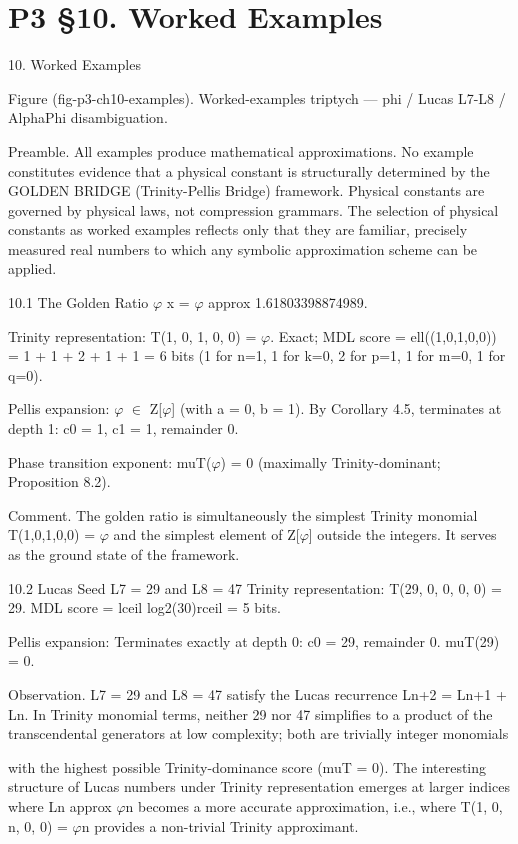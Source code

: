 
\section{P3 §10. Worked Examples}

10. Worked Examples

           Figure (fig-p3-ch10-examples). Worked-examples triptych --- phi / Lucas L7-L8 / AlphaPhi
                                              disambiguation.

  Preamble. All examples produce mathematical approximations. No example constitutes
  evidence that a physical constant is structurally determined by the GOLDEN BRIDGE (Trinity-Pellis Bridge)
  framework. Physical constants are governed by physical laws, not compression
  grammars. The selection of physical constants as worked examples reflects only that
  they are familiar, precisely measured real numbers to which any symbolic
  approximation scheme can be applied.

  10.1 The Golden Ratio $\varphi$
  x = $\varphi$ approx 1.61803398874989.

  Trinity representation: T(1, 0, 1, 0, 0) = $\varphi$. Exact; MDL score = ell((1,0,1,0,0)) = 1 + 1 +
  2 + 1 + 1 = 6 bits (1 for n=1, 1 for k=0, 2 for p=1, 1 for m=0, 1 for q=0).

  Pellis expansion: $\varphi$ $\in$ Z[$\varphi$] (with a = 0, b = 1). By Corollary 4.5, terminates at depth 1:
  c0 = 1, c1 = 1, remainder 0.

  Phase transition exponent: muT($\varphi$) = 0 (maximally Trinity-dominant; Proposition 8.2).

  Comment. The golden ratio is simultaneously the simplest Trinity monomial T(1,0,1,0,0)
  = $\varphi$ and the simplest element of Z[$\varphi$] outside the integers. It serves as the ground state
  of the framework.

  10.2 Lucas Seed L7 = 29 and L8 = 47
  Trinity representation: T(29, 0, 0, 0, 0) = 29. MDL score = lceil log2(30)rceil = 5 bits.

  Pellis expansion: Terminates exactly at depth 0: c0 = 29, remainder 0. muT(29) = 0.

        Observation. L7 = 29 and L8 = 47 satisfy the Lucas recurrence Ln+2 = Ln+1 +
        Ln. In Trinity monomial terms, neither 29 nor 47 simplifies to a product of the
        transcendental generators at low complexity; both are trivially integer monomials

        with the highest possible Trinity-dominance score (muT = 0). The interesting
        structure of Lucas numbers under Trinity representation emerges at larger indices
        where Ln approx $\varphi$n becomes a more accurate approximation, i.e., where T(1, 0, n,
        0, 0) = $\varphi$n provides a non-trivial Trinity approximant.

